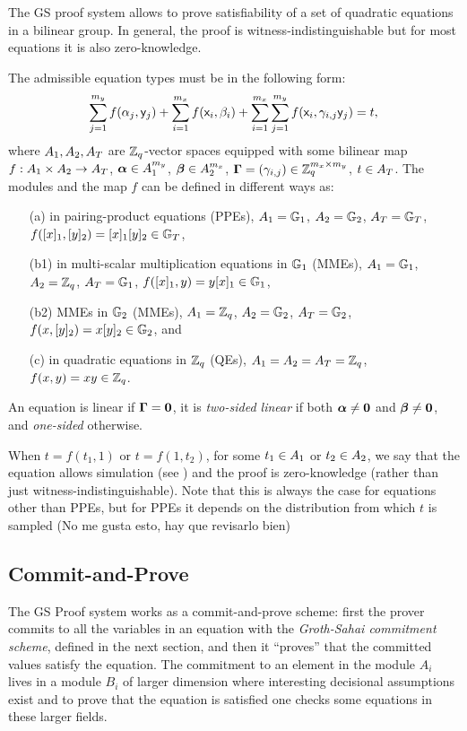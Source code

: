 The GS proof system allows to prove satisfiability of a set of quadratic equations in a bilinear group. In general, the proof is witness-indistinguishable but for most equations it is also zero-knowledge.

The admissible equation types must be in the following form:
\begin{equation}\label{gseq}
\sum_{j=1}^{m_y} f(\alpha_j, \mathsf{y}_j)+\sum_{i=1}^{m_x} f(\mathsf{x}_i, \beta_i)+\sum_{i=1}^{m_x} \sum_{j=1}^{m_y}  f(\mathsf{x}_i,\gamma_{i,j} \mathsf{y}_j)=t,
\end{equation}
 where $A_1,A_2,A_T$ are $\mathbb{Z}_q$-vector spaces equipped with some bilinear map $f:A_1\times A_2 \rightarrow A_T$, $\boldsymbol \alpha  \in A_1^{m_y}$, $\boldsymbol \beta  \in A_2^{m_x}$, $\mathbf{{\Gamma}}=(\gamma_{i,j}) \in \mathbb{Z}_q^{m_x\times m_y}$, $t \in A_T$. The modules and the map $f$ can be defined in different ways as:
\begin{itemize}
\item[(a)] in pairing-product equations (PPEs), $A_1=\mathbb{G}_1$, $A_2=\mathbb{G}_2$, $A_T=\mathbb{G}_T$, $f([x]_1,[y]_2)=[x]_1 [y]_2 \in \mathbb{G}_T$,
\item[(b1)] in multi-scalar multiplication equations in $\mathbb{G}_1$ (MMEs), $A_1=\mathbb{G}_1$, $A_2=\mathbb{Z}_q$, $A_T=\mathbb{G}_1$, $f([x]_1,y)=y [x]_1 \in \mathbb{G}_1$,
\item[(b2)] MMEs in $\mathbb{G}_2$ (MMEs),  $A_1=\mathbb{Z}_q$, $A_2=\mathbb{G}_2$, $A_T=\mathbb{G}_2$, $f(x,[y]_2)=x [y]_2 \in \mathbb{G}_2$, and
\item[(c)] in quadratic equations in $\mathbb{Z}_q$ (QEs), $A_1=A_2=A_T=\mathbb{Z}_q$, $f(x,y)=xy \in \mathbb{Z}_q$.
\end{itemize} 
 An equation is linear if $\mathbf{{\Gamma}}=\mathbf{0}$, 
 it is \textit{two-sided linear} if both $\boldsymbol \alpha \neq \mathbf{0}$ and $\boldsymbol \beta \neq \mathbf{0}$, and \textit{one-sided} otherwise.

When $t=f(t_1,1)$ or $t=f(1,t_2)$, for some $t_1\in A_1$ or $t_2\in A_2$, we say that the equation allows simulation (see \cite[Sect. 11]{SIAMJC:GroSah12}) and the proof is zero-knowledge (rather than just witness-indistinguishable). Note that this is always the case for equations other than PPEs, but for PPEs it depends on the distribution from which $t$ is sampled {\color{red} (No me gusta esto, hay que revisarlo bien)}

\subsection{Commit-and-Prove} The GS Proof system works as a commit-and-prove scheme: first the prover commits to 
all the variables in an equation with the \emph{Groth-Sahai commitment scheme}, defined in the next section, and then it ``proves'' that the committed values satisfy the equation. The commitment to an element in the module $A_i$ lives in a module $B_i$ of larger dimension where interesting decisional assumptions exist and to prove that the equation is satisfied one checks some equations in these larger fields.

